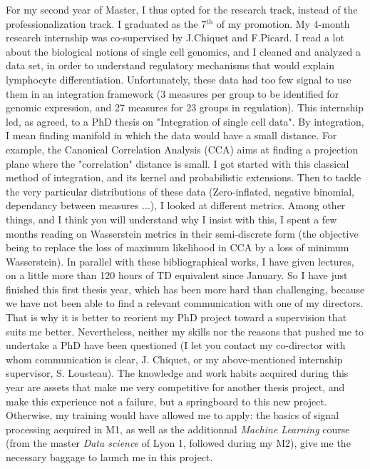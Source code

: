 \documentclass[a4paper,12pt]{article}
\begin{document}
For my second year of Master, I thus opted for the research track, instead of the professionalization track. I graduated as the 7$^{\text{th}}$ of my promotion. 
My 4-month research internship was co-supervised by J.Chiquet and F.Picard. I read a lot about the biological notions of single cell genomics, and I cleaned and analyzed a data set, in order to understand regulatory mechanisms that would explain lymphocyte differentiation. Unfortunately, these data had too few signal to use them in an integration framework (3 measures per group to be identified for genomic expression, and 27 measures for 23 groups in regulation). This internship led, as agreed, to a PhD thesis on "Integration of single cell data". 
By integration, I mean finding manifold in which the data would have a small distance. For example, the Canonical Correlation Analysis (CCA) aims at finding a projection plane where the "correlation" distance is small. I got started with this classical method of integration, and its kernel and probabilistic extensions. Then to tackle the very particular distributions of these data (Zero-inflated, negative binomial, dependancy between measures ...), I looked at different metrics. Among other things, and I think you will understand why I insist with this, I spent a few months reading on Wasserstein metrics in their semi-discrete form (the objective being to replace the loss of maximum likelihood in CCA by a loss of minimum Wasserstein). In parallel with these bibliographical works, I have given lectures, on a little more than 120 hours of TD equivalent since January. 
So I have just finished this first thesis year, which has been more hard than challenging, because we have not been able to find a relevant communication with one of my directors. That is why it is better to reorient my PhD project toward a supervision that suits me better. 
Nevertheless, neither my skills nor the reasons that pushed me to undertake a PhD have been questioned (I let you contact my co-director with whom communication is clear, J. Chiquet, or my above-mentioned internship supervisor, S. Lousteau). 
The knowledge and work habits acquired during this year are assets that make me very competitive for another thesis project, and make this experience not a failure, but a springboard to this new project. 
%
Otherwise, my training would have allowed me to apply: the basics of signal processing acquired in M1, as well as the additionnal \textit{Machine Learning} course (from the master \textit{Data science} of Lyon 1, followed during my M2), give me the necessary baggage to launch me in this project. 
\end{document}

